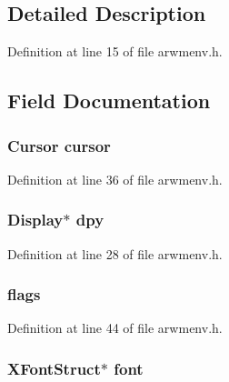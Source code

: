 \subsection{Detailed Description}


Definition at line 15 of file arwmenv.h.



\subsection{Field Documentation}
\hypertarget{struct_a_r_w_m_environment_a7a12555ff8c0a52bed4956969fd82d88}{
\subsubsection[{cursor}]{\setlength{\rightskip}{0pt plus 5cm}Cursor {\bf cursor}}}
\label{struct_a_r_w_m_environment_a7a12555ff8c0a52bed4956969fd82d88}


Definition at line 36 of file arwmenv.h.

\hypertarget{struct_a_r_w_m_environment_a7d43b3edf58f8d85a89852ab95b740f6}{
\subsubsection[{dpy}]{\setlength{\rightskip}{0pt plus 5cm}Display$\ast$ {\bf dpy}}}
\label{struct_a_r_w_m_environment_a7d43b3edf58f8d85a89852ab95b740f6}


Definition at line 28 of file arwmenv.h.

\hypertarget{struct_a_r_w_m_environment_a6fe1f727acb55f187efc1261f60004f8}{
\subsubsection[{flags}]{ {\bf flags}}}
\label{struct_a_r_w_m_environment_a6fe1f727acb55f187efc1261f60004f8}


Definition at line 44 of file arwmenv.h.

\hypertarget{struct_a_r_w_m_environment_a2339fdaf39b53e1d4619fe087759f80a}{
\subsubsection[{font}]{\setlength{\rightskip}{0pt plus 5cm}XFontStruct$\ast$ {\bf font}}}
\label{struct_a_r_w_m_environment_a2339fdaf39b53e1d4619fe087759f80a}


